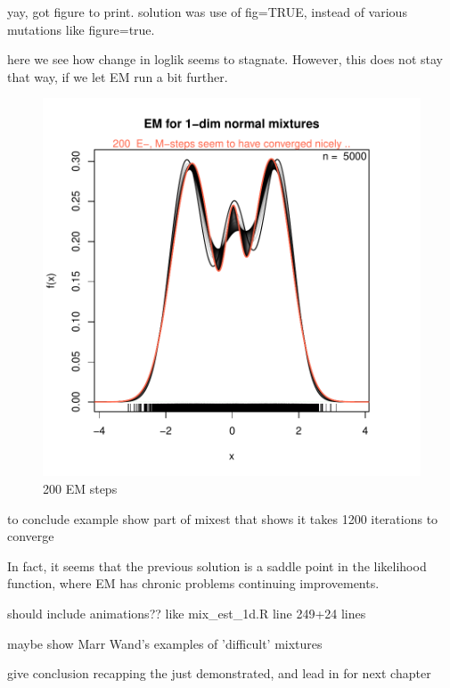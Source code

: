 yay, got figure to print. solution was use of fig=TRUE, instead of various mutations like figure=true.

here we see how change in loglik seems to stagnate. However, this does not stay that way, if we let EM run a bit further.


\begin{figure}
\begin{center}
\includegraphics{chapter1-006}
\end{center}
\caption{200 EM steps}
\label{adfafdafds}
\end{figure}

to conclude example show part of mixest that shows it takes 1200 iterations to converge

In fact, it seems that the previous solution is a saddle point in the likelihood function, where EM has chronic problems continuing improvements.

should include animations?? like mix\_est\_1d.R line 249+24 lines

maybe show Marr Wand's examples of 'difficult' mixtures

give conclusion recapping the just demonstrated, and lead in for next chapter





